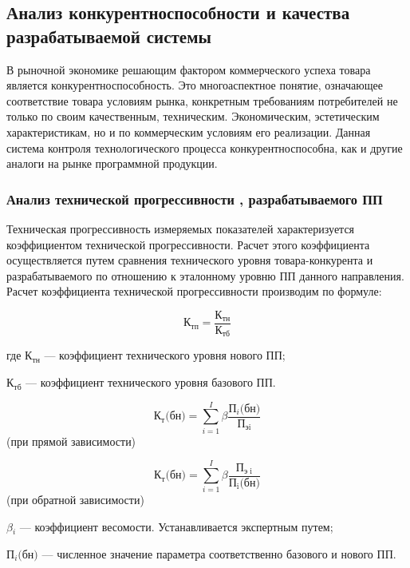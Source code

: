 \subsection{Анализ конкурентноспособности и качества   разрабатываемой системы}
В рыночной экономике решающим фактором коммерческого успеха товара является конкурентноспособность.
Это многоаспектное понятие, означающее соответствие товара условиям рынка, конкретным
требованиям потребителей не только по своим качественным, техническим.
Экономическим, эстетическим характеристикам, но и по коммерческим условиям его реализации.
Данная система контроля технологического процесса конкурентноспособна, как и другие аналоги
на рынке программной продукции.

\subsubsection{Анализ технической  прогрессивности , разрабатываемого ПП}
Техническая прогрессивность  измеряемых показателей  характеризуется
коэффициентом технической прогрессивности. Расчет этого коэффициента 
осуществляется путем сравнения  технического уровня  товара-конкурента
и разрабатываемого по отношению к эталонному уровню  ПП  данного направления.
Расчет коэффициента технической прогрессивности производим по формуле:

\begin{equation}
	\textrm{К}_\textrm{тп} = \frac{\textrm{К}_\textrm{тн}}{\textrm{К}_\textrm{тб}}
\end{equation}
\begin{ESKDexplanation}
	\item[где ]{} $\textrm{К}_\textrm{тн}$ --- коэффициент технического уровня нового ПП;
	\item{} $\textrm{К}_\textrm{тб}$ --- коэффициент технического уровня базового ПП.
\end{ESKDexplanation}


\begin{equation}
	\textrm{К}_\textrm{т}\textrm{(бн)} = \sum_{i=1}^{I}\beta{}\frac{\textrm{П}_i\textrm{(бн)}}{\textrm{П}_\textrm{эi}}
\end{equation}
(при прямой зависимости)


\begin{equation}
	\textrm{К}_\textrm{т}\textrm{(бн)} = \sum_{i=1}^{I}\beta{}\frac{\textrm{П}_\textrm{э i}}{\textrm{П}_\textrm{i}\textrm{(бн)}}
\end{equation}
(при обратной зависимости)

\begin{ESKDexplanation}
	\item{} $\beta{}_i$ --- коэффициент весомости. Устанавливается экспертным путем;
	\item{} $\textrm{П}_i\textrm{(бн)}$ --- численное значение параметра соответственно базового и нового ПП.
\end{ESKDexplanation}


